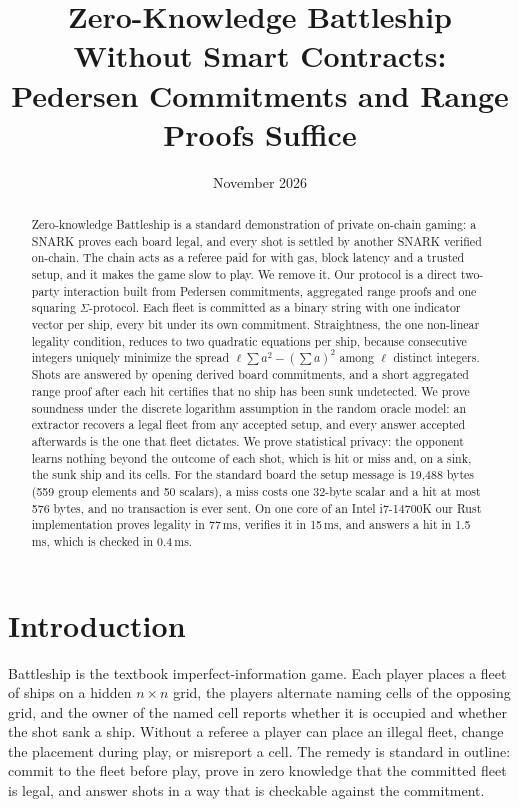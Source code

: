 \documentclass[11pt]{article}
\title{Zero-Knowledge Battleship Without Smart Contracts:\\Pedersen Commitments and Range Proofs Suffice}
\author{}
\date{November 2026}
\theoremstyle{definition}
\theoremstyle{remark}
\begin{document}
\maketitle

\begin{abstract}
Zero-knowledge Battleship is a standard demonstration of private on-chain gaming: a SNARK proves each board legal, and every shot is settled by another SNARK verified on-chain. The chain acts as a referee paid for with gas, block latency and a trusted setup, and it makes the game slow to play. We remove it. Our protocol is a direct two-party interaction built from Pedersen commitments, aggregated range proofs and one squaring $\Sigma$-protocol. Each fleet is committed as a binary string with one indicator vector per ship, every bit under its own commitment. Straightness, the one non-linear legality condition, reduces to two quadratic equations per ship, because consecutive integers uniquely minimize the spread $\ell\sum a^2-(\sum a)^2$ among $\ell$ distinct integers. Shots are answered by opening derived board commitments, and a short aggregated range proof after each hit certifies that no ship has been sunk undetected. We prove soundness under the discrete logarithm assumption in the random oracle model: an extractor recovers a legal fleet from any accepted setup, and every answer accepted afterwards is the one that fleet dictates. We prove statistical privacy: the opponent learns nothing beyond the outcome of each shot, which is hit or miss and, on a sink, the sunk ship and its cells. For the standard board the setup message is 19,488 bytes (559 group elements and 50 scalars), a miss costs one 32-byte scalar and a hit at most 576 bytes, and no transaction is ever sent. On one core of an Intel i7-14700K our Rust implementation proves legality in 77\,ms, verifies it in 15\,ms, and answers a hit in 1.5\,ms, which is checked in 0.4\,ms.
\end{abstract}

\section{Introduction}\label{sec:intro}
Battleship is the textbook imperfect-information game. Each player places a fleet of ships on a hidden $n\times n$ grid, the players alternate naming cells of the opposing grid, and the owner of the named cell reports whether it is occupied and whether the shot sank a ship. Without a referee a player can place an illegal fleet, change the placement during play, or misreport a cell. The remedy is standard in outline: commit to the fleet before play, prove in zero knowledge that the committed fleet is legal, and answer shots in a way that is checkable against the commitment.
\end{document}

